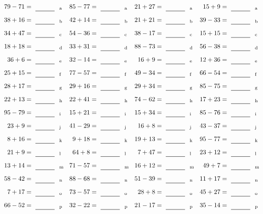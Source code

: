 \documentclass
[
  draft    = true,
  fontsize = 11pt,
  parskip  = half-
]
{scrartcl}
\begin{document}
\clearpage
\begin{align*}
    \pline{79-71}&=\rline{a}
  & \pline{85-77}&=\rline{a}
  & \pline{21+27}&=\rline{a}
  & \pline{15+9}&=\rline{a} \\[1ex]
    \pline{38+16}&=\rline{b}
  & \pline{42+14}&=\rline{b}
  & \pline{21+21}&=\rline{b}
  & \pline{39-33}&=\rline{b} \\[1ex]
    \pline{34+47}&=\rline{c}
  & \pline{54-36}&=\rline{c}
  & \pline{38-17}&=\rline{c}
  & \pline{15+15}&=\rline{c} \\[1ex]
    \pline{18+18}&=\rline{d}
  & \pline{33+31}&=\rline{d}
  & \pline{88-73}&=\rline{d}
  & \pline{56-38}&=\rline{d} \\[1ex]
    \pline{36+6}&=\rline{e}
  & \pline{32-14}&=\rline{e}
  & \pline{16+9}&=\rline{e}
  & \pline{12+36}&=\rline{e} \\[1ex]
    \pline{25+15}&=\rline{f}
  & \pline{77-57}&=\rline{f}
  & \pline{49-34}&=\rline{f}
  & \pline{66-54}&=\rline{f} \\[1ex]
    \pline{28+17}&=\rline{g}
  & \pline{29+16}&=\rline{g}
  & \pline{29+34}&=\rline{g}
  & \pline{85-75}&=\rline{g} \\[1ex]
    \pline{22+13}&=\rline{h}
  & \pline{22+41}&=\rline{h}
  & \pline{74-62}&=\rline{h}
  & \pline{17+23}&=\rline{h} \\[1ex]
    \pline{95-79}&=\rline{i}
  & \pline{15+21}&=\rline{i}
  & \pline{15+34}&=\rline{i}
  & \pline{85-76}&=\rline{i} \\[1ex]
    \pline{23+9}&=\rline{j}
  & \pline{41-29}&=\rline{j}
  & \pline{16+8}&=\rline{j}
  & \pline{43-37}&=\rline{j} \\[1ex]
    \pline{8+16}&=\rline{k}
  & \pline{9+18}&=\rline{k}
  & \pline{19+13}&=\rline{k}
  & \pline{95-77}&=\rline{k} \\[1ex]
    \pline{21+9}&=\rline{l}
  & \pline{64+8}&=\rline{l}
  & \pline{7+47}&=\rline{l}
  & \pline{23+12}&=\rline{l} \\[1ex]
    \pline{13+14}&=\rline{m}
  & \pline{71-57}&=\rline{m}
  & \pline{16+12}&=\rline{m}
  & \pline{49+7}&=\rline{m} \\[1ex]
    \pline{58-42}&=\rline{n}
  & \pline{88-68}&=\rline{n}
  & \pline{51-39}&=\rline{n}
  & \pline{11+17}&=\rline{n} \\[1ex]
    \pline{7+17}&=\rline{o}
  & \pline{73-57}&=\rline{o}
  & \pline{28+8}&=\rline{o}
  & \pline{45+27}&=\rline{o} \\[1ex]
    \pline{66-52}&=\rline{p}
  & \pline{32-22}&=\rline{p}
  & \pline{21-17}&=\rline{p}
  & \pline{35-14}&=\rline{p}
\end{align*}
\end{document}
